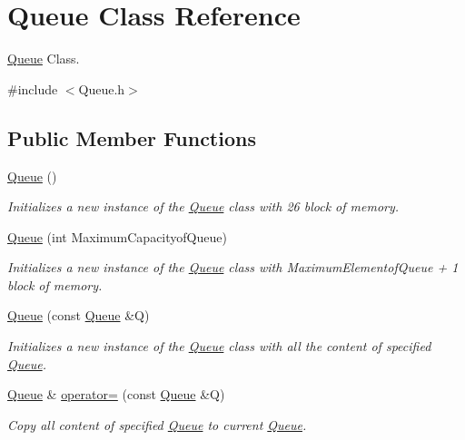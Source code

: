 \hypertarget{class_queue}{\section{Queue Class Reference}
\label{class_queue}
}


\hyperlink{class_queue}{Queue} Class.  




{\ttfamily \#include $<$Queue.\-h$>$}

\subsection*{Public Member Functions}
\begin{DoxyCompactItemize}
\item 
\hyperlink{class_queue_a7cfca3637d57c4a9e37351b3426ffd40}{Queue} ()
\begin{DoxyCompactList}\small\item\em Initializes a new instance of the \hyperlink{class_queue}{Queue} class with 26 block of memory. \end{DoxyCompactList}\item 
\hyperlink{class_queue_a9477bb38927e458bb211eb99cf89bda4}{Queue} (int Maximum\-Capacityof\-Queue)
\begin{DoxyCompactList}\small\item\em Initializes a new instance of the \hyperlink{class_queue}{Queue} class with Maximum\-Elementof\-Queue + 1 block of memory. \end{DoxyCompactList}\item 
\hyperlink{class_queue_acc9bf68f03677ae4e23dfda08f6ab63a}{Queue} (const \hyperlink{class_queue}{Queue} \&Q)
\begin{DoxyCompactList}\small\item\em Initializes a new instance of the \hyperlink{class_queue}{Queue} class with all the content of specified \hyperlink{class_queue}{Queue}. \end{DoxyCompactList}\item 
\hyperlink{class_queue}{Queue} \& \hyperlink{class_queue_a924ed23e355678aabd5d80551e9d3800}{operator=} (const \hyperlink{class_queue}{Queue} \&Q)
\begin{DoxyCompactList}\small\item\em Copy all content of specified \hyperlink{class_queue}{Queue} to current \hyperlink{class_queue}{Queue}. \end{DoxyCompactList}\item 

\end{DoxyCompactItemize}
